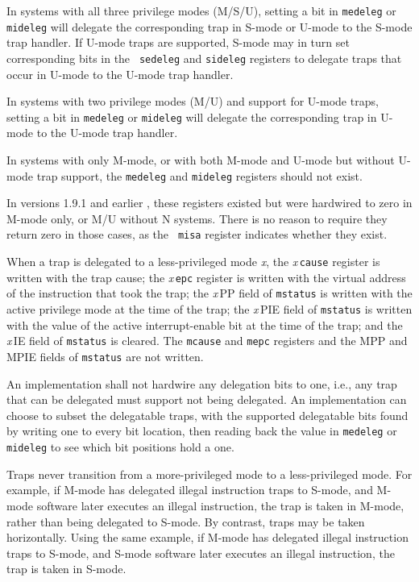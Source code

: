 In systems with all three privilege modes (M/S/U), setting a bit in
{\tt medeleg} or {\tt mideleg} will delegate the corresponding trap in
S-mode or U-mode to the S-mode trap handler. If U-mode traps are
supported, S-mode may in turn set corresponding bits in the {\tt
  sedeleg} and {\tt sideleg} registers to delegate traps that occur in
U-mode to the U-mode trap handler.

In systems with two privilege modes (M/U) and support for U-mode
traps, setting a bit in {\tt medeleg} or {\tt mideleg} will
delegate the corresponding trap in U-mode to the U-mode trap handler.

In systems with only M-mode, or with both M-mode and U-mode but
without U-mode trap support, the {\tt medeleg} and {\tt mideleg}
registers should not exist.
\begin{commentary}
  In versions 1.9.1 and earlier , these registers existed but were
  hardwired to zero in M-mode only, or M/U without N systems.  There
  is no reason to require they return zero in those cases, as the {\tt
    misa} register indicates whether they exist.
\end{commentary}


When a trap is delegated to a less-privileged mode {\em x}, the
{\em x}\,{\tt cause} register is written with the trap cause; the
{\em x}\,{\tt epc} register is written with the virtual address of
the instruction that took the trap; the {\em x}\,PP field
of {\tt mstatus} is written with the active privilege mode at the time of
the trap; the {\em x}\,PIE field of {\tt mstatus} is written with the
value of the active interrupt-enable bit at the time of the trap; and
the {\em x}\,IE field of {\tt mstatus} is cleared.  The {\tt mcause} and
{\tt mepc} registers and the MPP and MPIE fields of {\tt mstatus} are
not written.

An implementation shall not hardwire any delegation bits to one, i.e.,
any trap that can be delegated must support not being delegated.  An
implementation can choose to subset the delegatable traps, with the
supported delegatable bits found by writing one to every bit location,
then reading back the value in {\tt medeleg} or {\tt mideleg} to see
which bit positions hold a one.

Traps never transition from a more-privileged mode to a less-privileged mode.
For example, if M-mode has delegated illegal instruction traps to S-mode, and
M-mode software later executes an illegal instruction, the trap is taken in
M-mode, rather than being delegated to S-mode.  By contrast, traps may be
taken horizontally.  Using the same example, if M-mode has delegated illegal
instruction traps to S-mode, and S-mode software later executes an illegal
instruction, the trap is taken in S-mode.

